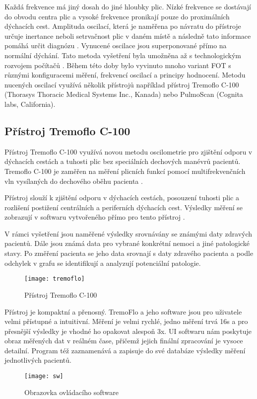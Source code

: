 Každá frekvence má jiný dosah do jiné hloubky plic. Nízké frekvence se dostávají do obvodu centra plic a vysoké frekvence pronikají pouze do proximálních dýchacích cest. Amplituda oscilací, která je naměřena po návratu do přístroje určuje inertance neboli setrvačnost plic v daném místě a následně tato informace pomáhá určit diagnózu \cite{Oostveen}. 
Vynucené oscilace jsou superponované přímo na normální dýchání. Tato metoda vyšetření byla umožněna až s technologickým rozvojem počítačů \cite{Vlcek2018}. Během této doby bylo vyvinuto mnoho variant FOT s různými konfiguracemi měření, frekvencí oscilací a principy hodnocení. Metodu nucených oscilací využívá několik přístrojů například přístroj Tremoflo C-100 (Thorasys Thoracic Medical Systems Inc., Kanada) nebo PulmoScan (Cognita labs, California).

\subsection{Přístroj Tremoflo C-100}
Přístroj Tremoflo C-100 využívá novou metodu oscilometrie pro zjištění odporu  v dýchacích cestách a tuhosti plic bez speciálních dechových manévrů pacientů. Tremoflo C-100 je zaměřen na měření plicních funkcí pomocí multifrekvenčních vln vysílaných do dechového oběhu pacienta \cite{Nasinec}.

Přístroj slouží k zjištění odporu v dýchacích cestách, posouzení tuhosti plic a rozlišení postižení centrálních a periferních dýchacích cest. Výsledky měření se zobrazují v softwaru vytvořeného přímo pro tento přístroj \cite{Nasinec}.

V rámci vyšetření jsou naměřené výsledky srovnávány se známými daty zdravých pacientů. Dále jsou známá data pro vybrané konkrétní nemoci a jiné patologické stavy.  Po změření pacienta se jeho data srovnají s daty zdravého pacienta a podle odchylek v grafu se identifikují a analyzují potenciální patologie. 

\begin{figure}[h]
			\centering
 			\texttt{[image: tremoflo]}
			\caption{Přístroj Tremoflo C-100 \cite{wwwpics}}
			 \label{tremoflopristroj}
 \end{figure}

Přístroj je kompaktní a přenosný. TremoFlo a jeho software jsou pro uživatele velmi přístupné a intuitivní. Měření je velmi rychlé, jedno měření trvá 16s a pro přesnější výsledky je vhodné ho opakovat alespoň 3x. UI softwaru nám poskytuje obraz měřených dat v reálném čase, přičemž jejich finální zpracování je vysoce detailní. Program též zaznamenává a zapisuje do své databáze výsledky měření jednotlivých pacientů.

\begin{figure}[h]
			\centering
 			\texttt{[image: sw]}
			\caption{Obrazovka ovládacího software \cite{wwwpics}}
			 \label{tremosw}
 \end{figure}
